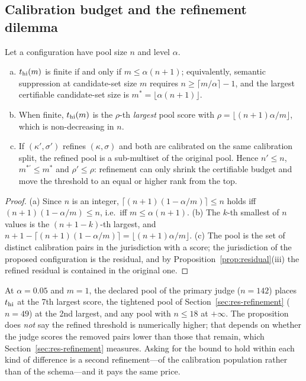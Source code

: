 \subsection{Calibration budget and the refinement dilemma}\label{sec:dilemma}

\begin{proposition}\label{prop:dilemma}
Let a configuration have pool size $n$ and level $\alpha$.
\begin{enumerate}[(a),leftmargin=*,itemsep=1pt]
\item $t_{\mathrm{hi}}(m)$ is finite if and only if $m\le\alpha(n+1)$; equivalently, semantic suppression at candidate-set size $m$ requires $n\ge\lceil m/\alpha\rceil-1$, and the largest certifiable candidate-set size is $m^\ast=\lfloor\alpha(n+1)\rfloor$.
\item When finite, $t_{\mathrm{hi}}(m)$ is the $\rho$-th \emph{largest} pool score with $\rho=\lfloor (n+1)\alpha/m\rfloor$, which is non-decreasing in $n$.
\item If $(\kappa',\sigma')$ refines $(\kappa,\sigma)$ and both are calibrated on the same calibration split, the refined pool is a sub-multiset of the original pool. Hence $n'\le n$, $m^{\ast\prime}\le m^\ast$ and $\rho'\le\rho$: refinement can only shrink the certifiable budget and move the threshold to an equal or higher rank from the top.
\end{enumerate}
\end{proposition}

\begin{proof}
(a) Since $n$ is an integer, $\lceil(n+1)(1-\alpha/m)\rceil\le n$ holds iff $(n+1)(1-\alpha/m)\le n$, i.e.\ iff $m\le\alpha(n+1)$. (b) The $k$-th smallest of $n$ values is the $(n+1-k)$-th largest, and $n+1-\lceil(n+1)(1-\alpha/m)\rceil=\lfloor (n+1)\alpha/m\rfloor$. (c) The pool is the set of distinct calibration pairs in the jurisdiction with a score; the jurisdiction of the proposed configuration is the residual, and by Proposition~\ref{prop:residual}(iii) the refined residual is contained in the original one.
\end{proof}

At $\alpha=0.05$ and $m=1$, the declared pool of the primary judge ($n=142$) places $t_{\mathrm{hi}}$ at the 7th largest score, the tightened pool of Section~\ref{sec:res-refinement} ($n=49$) at the 2nd largest, and any pool with $n\le18$ at $+\infty$. The proposition does \emph{not} say the refined threshold is numerically higher; that depends on whether the judge scores the removed pairs lower than those that remain, which Section~\ref{sec:res-refinement} measures. Asking for the bound to hold within each kind of difference is a second refinement---of the calibration population rather than of the schema---and it pays the same price.

